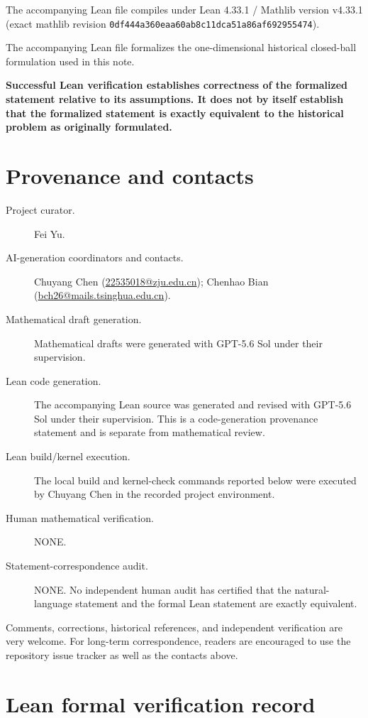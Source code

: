 \documentclass[11pt]{amsart}
\theoremstyle{definition}
\theoremstyle{remark}
\begin{document}
\medskip
\noindent The accompanying Lean file compiles under Lean 4.33.1 / Mathlib version v4.33.1 (exact mathlib revision \texttt{0df444a360eaa60ab8c11dca51a86af692955474}).

\medskip
\noindent The accompanying Lean file formalizes the one-dimensional historical closed-ball formulation used in this note.

\medskip
\noindent\textbf{Successful Lean verification establishes correctness of the formalized statement relative to its assumptions. It does not by itself establish that the formalized statement is exactly equivalent to the historical problem as originally formulated.}
\endgroup

\section*{Provenance and contacts}
\begingroup\small\sloppy
\begin{description}
\item[Project curator.] Fei Yu.
\item[AI-generation coordinators and contacts.] Chuyang Chen (\href{mailto:22535018@zju.edu.cn}{22535018@zju.edu.cn}); Chenhao Bian (\href{mailto:bch26@mails.tsinghua.edu.cn}{bch26@mails.tsinghua.edu.cn}).
\item[Mathematical draft generation.] Mathematical drafts were generated with GPT-5.6 Sol under their supervision.
\item[Lean code generation.] The accompanying Lean source was generated and revised with GPT-5.6 Sol under their supervision. This is a code-generation provenance statement and is separate from mathematical review.
\item[Lean build/kernel execution.] The local build and kernel-check commands reported below were executed by Chuyang Chen in the recorded project environment.
\item[Human mathematical verification.] NONE.
\item[Statement-correspondence audit.] NONE. No independent human audit has certified that the natural-language statement and the formal Lean statement are exactly equivalent.
\end{description}
\medskip
\noindent Comments, corrections, historical references, and independent verification are very welcome. For long-term correspondence, readers are encouraged to use the repository issue tracker as well as the contacts above.
\endgroup

\section*{Lean formal verification record}
\end{document}
